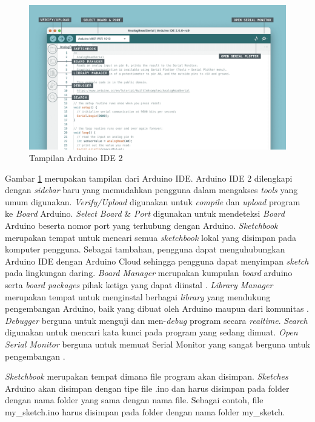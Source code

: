 \begin{figure} [ht] \centering
    \includegraphics[scale=0.235]{gambar/arduinoIDEoverview.png}
    \caption{Tampilan Arduino IDE 2}
    \label{fig:ArduinoIDEOverview}
\end{figure}

Gambar \ref{fig:ArduinoIDEOverview} merupakan tampilan dari Arduino IDE. Arduino IDE 2 dilengkapi dengan \emph{sidebar} baru yang memudahkan pengguna dalam mengakses \emph{tools} yang umum digunakan. \emph{Verify/Upload} digunakan untuk \emph{compile} dan \emph{upload} program ke \emph{Board} Arduino. \emph{Select Board} \& \emph{Port} digunakan untuk mendeteksi \emph{Board} Arduino beserta nomor port yang terhubung dengan Arduino. \emph{Sketchbook} merupakan tempat untuk mencari semua \emph{sketchbook} lokal yang disimpan pada komputer pengguna. Sebagai tambahan, pengguna dapat menguhubungkan Arduino IDE dengan Arduino Cloud sehingga pengguna dapat menyimpan \emph{sketch} pada lingkungan daring. \emph{Board Manager} merupakan kumpulan \emph{board} arduino serta \emph{board packages} pihak ketiga yang dapat diinstal \parencite{Söderby_Hylén_2023b}. \emph{Library Manager} merupakan tempat untuk menginstal berbagai \emph{library} yang mendukung pengembangan Arduino, baik yang dibuat oleh Arduino maupun dari komunitas \parencite{Söderby_Hylén_2023c}. \emph{Debugger} berguna untuk menguji dan men-\emph{debug} program secara \emph{realtime}. \emph{Search} digunakan untuk mencari kata kunci pada program yang sedang dimuat. \emph{Open Serial Monitor} berguna untuk memuat Serial Monitor yang sangat berguna untuk pengembangan \parencite{Söderby_2023}.

\emph{Sketchbook} merupakan tempat dimana file program akan disimpan. \emph{Sketches} Arduino akan disimpan dengan tipe file .ino dan harus disimpan pada folder dengan nama folder yang sama dengan nama file. Sebagai contoh, file my\_sketch.ino harus disimpan pada folder dengan nama folder my\_sketch.

